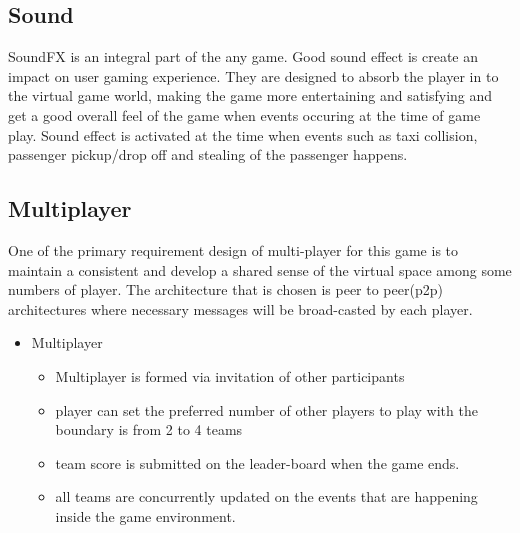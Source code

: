 \subsection*{Sound}
	SoundFX is an integral part of the any game. Good sound effect is create an impact on user gaming experience. They are designed to absorb the player in to the virtual game world, making the game more entertaining and satisfying and get a good overall feel of the game when events occuring at the time of game play. Sound effect is activated at the time when events such as taxi collision, passenger pickup/drop off and stealing of the passenger happens. 


\subsection*{Multiplayer}
One of the primary requirement design of multi-player for this game is to maintain a consistent and develop a shared sense of the virtual space among some numbers of player. The architecture that is chosen is peer to peer(p2p) architectures where necessary messages will be broad-casted by each player.
\begin{itemize}
	\item Multiplayer
		\begin{itemize}
			\item Multiplayer is formed via invitation of other participants 
			\item player can set the preferred number of other players to play with the boundary is from 2 to 4 teams 
			\item team score is submitted on the leader-board when the game ends.
			\item all teams are concurrently updated on the events that are happening inside the game environment.
		\end{itemize}	
\end{itemize}